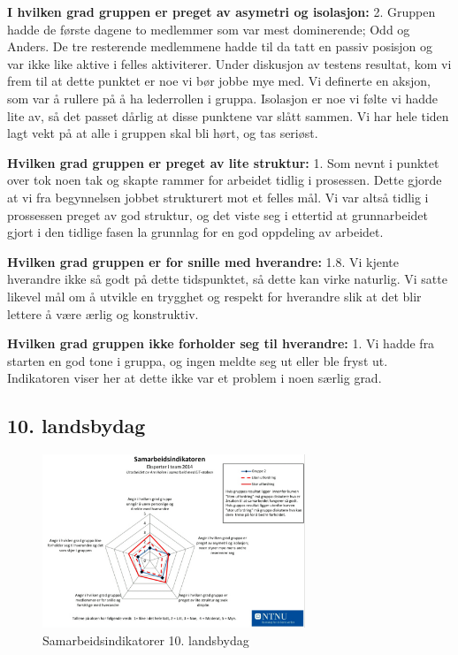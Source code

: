 \noindent \textbf{I hvilken grad gruppen er preget av asymetri og isolasjon:} 2.
\newline
\noindent Gruppen hadde de første dagene to medlemmer som var mest dominerende; Odd og Anders.
De tre resterende medlemmene hadde til da tatt en passiv posisjon og var ikke like aktive i felles aktiviterer. 
Under diskusjon av testens resultat, kom vi frem til at dette punktet er noe vi bør jobbe mye med. Vi definerte en aksjon, som var å rullere på å ha lederrollen i gruppa. 
Isolasjon er noe vi følte vi hadde lite av, så det passet dårlig at disse punktene var slått sammen. Vi har hele tiden lagt vekt på at alle i gruppen skal bli hørt, og tas seriøst. 

\vspace{\secspace}

\noindent \textbf{Hvilken grad gruppen er preget av lite struktur:} 1.
\newline
\noindent Som nevnt i punktet over tok noen tak og skapte rammer for arbeidet tidlig i prosessen. Dette gjorde at vi fra begynnelsen jobbet strukturert mot et felles mål. Vi var altså tidlig i prossessen preget av god struktur, og det viste seg i ettertid at grunnarbeidet gjort i den tidlige fasen la grunnlag for en god oppdeling av arbeidet. 
\vspace{\secspace}

\noindent \textbf{Hvilken grad gruppen er for snille med hverandre:} 1.8.
\newline
\noindent Vi kjente hverandre ikke så godt på dette tidspunktet, så dette kan virke naturlig. Vi satte likevel mål om å utvikle en trygghet og respekt for hverandre slik at det blir lettere å være ærlig og konstruktiv.
\vspace{\secspace}

\noindent \textbf{Hvilken grad gruppen ikke forholder seg til hverandre:} 1.
\newline
\noindent Vi hadde fra starten en god tone i gruppa, og ingen meldte seg ut eller ble fryst ut. Indikatoren viser her at dette ikke var et problem i noen særlig grad.

\subsection{10. landsbydag}
\begin{figure}[H]
    \centering
    \includegraphics[width=0.7\textwidth]{images/sam2.png} 
    \caption{Samarbeidsindikatorer 10. landsbydag}
    \label{fig:sam2}
\end{figure}

